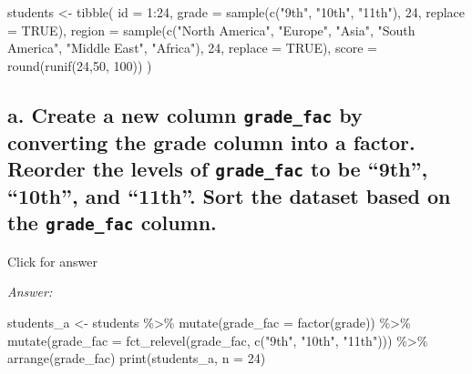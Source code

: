\documentclass[
]{book}
\newenvironment{Shaded}{\begin{snugshade}}{\end{snugshade}}
\newcommand{\AttributeTok}[1]{\textcolor[rgb]{0.77,0.63,0.00}{#1}}
\newcommand{\ConstantTok}[1]{\textcolor[rgb]{0.00,0.00,0.00}{#1}}
\newcommand{\DecValTok}[1]{\textcolor[rgb]{0.00,0.00,0.81}{#1}}
\newcommand{\FunctionTok}[1]{\textcolor[rgb]{0.00,0.00,0.00}{#1}}
\newcommand{\NormalTok}[1]{#1}
\newcommand{\OtherTok}[1]{\textcolor[rgb]{0.56,0.35,0.01}{#1}}
\newcommand{\SpecialCharTok}[1]{\textcolor[rgb]{0.00,0.00,0.00}{#1}}
\newcommand{\StringTok}[1]{\textcolor[rgb]{0.31,0.60,0.02}{#1}}
\begin{document}
\begin{Shaded}
\begin{Highlighting}[]
\NormalTok{students }\OtherTok{\textless{}{-}} \FunctionTok{tibble}\NormalTok{(}
  \AttributeTok{id =} \DecValTok{1}\SpecialCharTok{:}\DecValTok{24}\NormalTok{,}
  \AttributeTok{grade =} \FunctionTok{sample}\NormalTok{(}\FunctionTok{c}\NormalTok{(}\StringTok{"9th"}\NormalTok{, }\StringTok{"10th"}\NormalTok{, }\StringTok{"11th"}\NormalTok{), }\DecValTok{24}\NormalTok{, }\AttributeTok{replace =} \ConstantTok{TRUE}\NormalTok{),}
  \AttributeTok{region =} \FunctionTok{sample}\NormalTok{(}\FunctionTok{c}\NormalTok{(}\StringTok{"North America"}\NormalTok{, }\StringTok{"Europe"}\NormalTok{, }\StringTok{"Asia"}\NormalTok{, }\StringTok{"South America"}\NormalTok{, }\StringTok{"Middle East"}\NormalTok{, }\StringTok{"Africa"}\NormalTok{), }\DecValTok{24}\NormalTok{, }\AttributeTok{replace =} \ConstantTok{TRUE}\NormalTok{),}
  \AttributeTok{score =} \FunctionTok{round}\NormalTok{(}\FunctionTok{runif}\NormalTok{(}\DecValTok{24}\NormalTok{,}\DecValTok{50}\NormalTok{, }\DecValTok{100}\NormalTok{))}
\NormalTok{)}
\end{Highlighting}
\end{Shaded}

\hypertarget{a.-create-a-new-column-grade_fac-by-converting-the-grade-column-into-a-factor.-reorder-the-levels-of-grade_fac-to-be-9th-10th-and-11th.-sort-the-dataset-based-on-the-grade_fac-column.}{%
\subsection{\texorpdfstring{a. Create a new column \texttt{grade\_fac} by converting the grade column into a factor. Reorder the levels of \texttt{grade\_fac} to be ``9th'', ``10th'', and ``11th''. Sort the dataset based on the \texttt{grade\_fac} column.}{a. Create a new column grade\_fac by converting the grade column into a factor. Reorder the levels of grade\_fac to be ``9th'', ``10th'', and ``11th''. Sort the dataset based on the grade\_fac column.}}\label{a.-create-a-new-column-grade_fac-by-converting-the-grade-column-into-a-factor.-reorder-the-levels-of-grade_fac-to-be-9th-10th-and-11th.-sort-the-dataset-based-on-the-grade_fac-column.}}

Click for answer

\emph{Answer:}

\begin{Shaded}
\begin{Highlighting}[]
\NormalTok{students\_a }\OtherTok{\textless{}{-}}\NormalTok{ students }\SpecialCharTok{\%\textgreater{}\%}
  \FunctionTok{mutate}\NormalTok{(}\AttributeTok{grade\_fac =} \FunctionTok{factor}\NormalTok{(grade)) }\SpecialCharTok{\%\textgreater{}\%}
  \FunctionTok{mutate}\NormalTok{(}\AttributeTok{grade\_fac =} \FunctionTok{fct\_relevel}\NormalTok{(grade\_fac, }\FunctionTok{c}\NormalTok{(}\StringTok{"9th"}\NormalTok{, }\StringTok{"10th"}\NormalTok{, }\StringTok{"11th"}\NormalTok{))) }\SpecialCharTok{\%\textgreater{}\%}
  \FunctionTok{arrange}\NormalTok{(grade\_fac) }
\FunctionTok{print}\NormalTok{(students\_a, }\AttributeTok{n =} \DecValTok{24}\NormalTok{)}
\end{Highlighting}
\end{Shaded}
\end{document}
